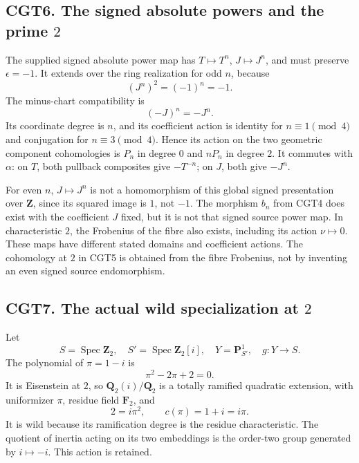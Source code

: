 \subsection{\texorpdfstring{CGT6. The signed absolute powers and the
prime
\(2\)}{CGT6. The signed absolute powers and the prime 2}}\label{cgt6.-the-signed-absolute-powers-and-the-prime-2}

The supplied signed absolute power map has \(T\mapsto T^n\),
\(J\mapsto J^n\), and must preserve \(\epsilon=-1\). It extends over the
ring realization for odd \(n\), because \[
(J^n)^2=(-1)^n=-1.
\tag{CGT6.1}
\] The minus-chart compatibility is \[
(-J)^n=-J^n.
\tag{CGT6.2}
\] Its coordinate degree is \(n\), and its coefficient action is
identity for \(n\equiv1\pmod4\) and conjugation for \(n\equiv3\pmod4\).
Hence its action on the two geometric component cohomologies is \(P_n\)
in degree \(0\) and \(nP_n\) in degree \(2\). It commutes with
\(\alpha\): on \(T\), both pullback composites give \(-T^{-n}\); on
\(J\), both give \(-J^n\).

For even \(n\), \(J\mapsto J^n\) is not a homomorphism of this global
signed presentation over \(\mathbf Z\), since its squared image is
\(1\), not \(-1\). The morphism \(b_n\) from CGT4 does exist with the
coefficient \(J\) fixed, but it is not that signed source power map. In
characteristic \(2\), the Frobenius of the fibre also exists, including
its action \(\nu\mapsto0\). These maps have different stated domains and
coefficient actions. The cohomology at \(2\) in CGT5 is obtained from
the fibre Frobenius, not by inventing an even signed source
endomorphism.

\subsection{\texorpdfstring{CGT7. The actual wild specialization at
\(2\)}{CGT7. The actual wild specialization at 2}}\label{cgt7.-the-actual-wild-specialization-at-2}

Let \[
S=\operatorname{Spec}\mathbf Z_2,\quad
S'=\operatorname{Spec}\mathbf Z_2[i],\quad
Y=\mathbf P^1_{S'},\quad g:Y\to S.
\tag{CGT7.1}
\] The polynomial of \(\pi=1-i\) is \[
\pi^2-2\pi+2=0.
\tag{CGT7.2}
\] It is Eisenstein at \(2\), so \(\mathbf Q_2(i)/\mathbf Q_2\) is a
totally ramified quadratic extension, with uniformizer \(\pi\), residue
field \(\mathbf F_2\), and \[
2=i\pi^2,\qquad c(\pi)=1+i=i\pi.
\tag{CGT7.3}
\] It is wild because its ramification degree is the residue
characteristic. The quotient of inertia acting on its two embeddings is
the order-two group generated by \(i\mapsto-i\). This action is
retained.

